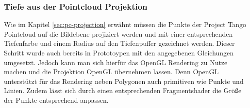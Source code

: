 \subsubsection*{Tiefe aus der Pointcloud Projektion}

Wie im Kapitel \ref{sec:pc-projection} erwähnt müssen die Punkte der Project Tango Pointcloud auf die Bildebene projiziert werden und mit einer entsprechenden Tiefenfarbe und einem Radius auf den Tiefenpuffer gezeichnet werden. Dieser Schritt wurde auch bereits in Prototoypen mit den angegebenen Gleichungen umgesetzt. Jedoch kann man sich hierfür das OpenGL Rendering zu Nutze machen und die Projektion OpenGL übernehmen lassen. Denn OpenGL unterstützt für das Rendering neben Polygonen auch primitiven wie Punkte und Linien.  Zudem lässt sich durch einen entsprechenden Fragmentshader die Größe der Punkte entsprechend anpassen.


